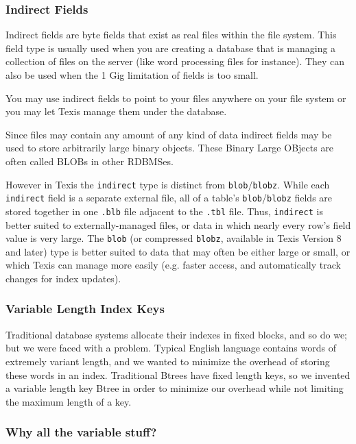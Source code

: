 \subsubsection{Indirect Fields}

Indirect fields are byte fields that exist as real files within the
file system.  This field type is usually used when you are creating a
database that is managing a collection of files on the server (like
word processing files for instance).  They can also be used when the 1
Gig limitation of fields is too small.

You may use indirect fields to point to your files anywhere on your
file system or you may let Texis manage them under the database.

Since files may contain any amount of any kind of data indirect
fields may be used to store arbitrarily large binary objects.
These Binary Large OBjects are often called BLOBs in other RDBMSes.

However in Texis the \verb`indirect` type is distinct from
\verb`blob`/\verb`blobz`.  While each \verb`indirect` field is a
separate external file, all of a table's \verb`blob`/\verb`blobz`
fields are stored together in one \verb`.blb` file adjacent to the
\verb`.tbl` file.  Thus, \verb`indirect` is better suited to
externally-managed files, or data in which nearly every row's field
value is very large.  The \verb`blob` (or compressed \verb`blobz`,
available in Texis Version 8 and later) type is better suited to data
that may often be either large or small, or which Texis can manage
more easily (e.g. faster access, and automatically track changes for
index updates).

\subsubsection{Variable Length Index Keys}

Traditional database systems allocate their indexes in fixed blocks,
and so do we; but we were faced with a problem.  Typical English
language contains words of extremely variant length, and we wanted to
minimize the overhead of storing these words in an index.  Traditional
Btrees have fixed length keys, so we invented a variable length key
Btree in order to minimize our overhead while not limiting the maximum
length of a key.

\subsubsection{Why all the variable stuff?}

